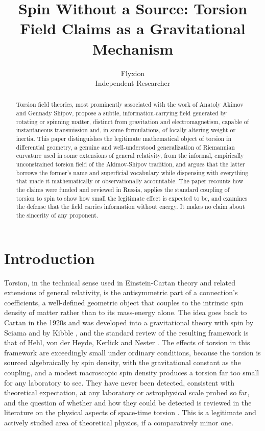 \documentclass[11pt]{article}
\title{Spin Without a Source: Torsion Field Claims as a Gravitational Mechanism}
\author{Flyxion \\ \small Independent Researcher}
\date{}
\begin{document}
\maketitle

\begin{abstract}
Torsion field theories, most prominently associated with the work of Anatoly Akimov and Gennady Shipov, propose a subtle, information-carrying field generated by rotating or spinning matter, distinct from gravitation and electromagnetism, capable of instantaneous transmission and, in some formulations, of locally altering weight or inertia. This paper distinguishes the legitimate mathematical object of torsion in differential geometry, a genuine and well-understood generalization of Riemannian curvature used in some extensions of general relativity, from the informal, empirically unconstrained torsion field of the Akimov-Shipov tradition, and argues that the latter borrows the former's name and superficial vocabulary while dispensing with everything that made it mathematically or observationally accountable. The paper recounts how the claims were funded and reviewed in Russia, applies the standard coupling of torsion to spin to show how small the legitimate effect is expected to be, and examines the defense that the field carries information without energy. It makes no claim about the sincerity of any proponent.
\end{abstract}

\section{Introduction}

Torsion, in the technical sense used in Einstein-Cartan theory and related extensions of general relativity, is the antisymmetric part of a connection's coefficients, a well-defined geometric object that couples to the intrinsic spin density of matter rather than to its mass-energy alone. The idea goes back to Cartan in the 1920s and was developed into a gravitational theory with spin by Sciama and by Kibble \cite{K1961}, and the standard review of the resulting framework is that of Hehl, von der Heyde, Kerlick and Nester \cite{HHKN1976}. The effects of torsion in this framework are exceedingly small under ordinary conditions, because the torsion is sourced algebraically by spin density, with the gravitational constant as the coupling, and a modest macroscopic spin density produces a torsion far too small for any laboratory to see. They have never been detected, consistent with theoretical expectation, at any laboratory or astrophysical scale probed so far, and the question of whether and how they could be detected is reviewed in the literature on the physical aspects of space-time torsion \cite{S2002}. This is a legitimate and actively studied area of theoretical physics, if a comparatively minor one.
\end{document}
